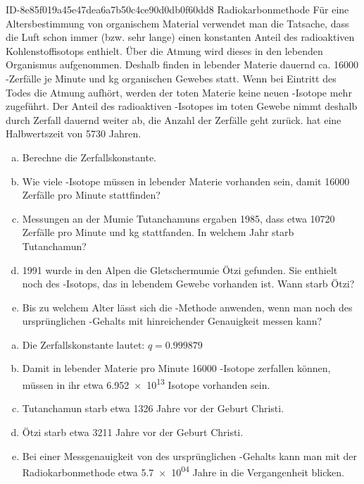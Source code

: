 \begin{exercise}
      {ID-8e85f019a45e47dea6a7b50c4ce90d0db0f60dd8}
      {Radiokarbonmethode}
  \ifproblem\problem
    Für eine Altersbestimmung von organischem Material verwendet
    man die Tatsache, dass die Luft schon immer (bzw. sehr lange)
    einen konstanten Anteil des radioaktiven Kohlenstoffisotops
     enthielt. Über die Atmung wird dieses in den
    lebenden Organismus aufgenommen. Deshalb finden in lebender
    Materie dauernd ca. \num{16000} -Zerfälle je Minute
    und \si{\kilo\gram} organischen Gewebes statt. Wenn bei
    Eintritt des Todes die Atmung aufhört, werden der toten
    Materie keine neuen -Isotope mehr zugeführt.
    Der Anteil des radioaktiven -Isotopes im toten
    Gewebe nimmt deshalb durch Zerfall dauernd weiter ab, die
    Anzahl der Zerfälle geht zurück.  hat eine
    Halbwertszeit von \num{5730} Jahren.
    \begin{enumerate}[a)]
      \item Berechne die Zerfallskonstante.
      \item Wie viele -Isotope müssen in 
            lebender Materie vorhanden sein, damit \num{16000}
            Zerfälle pro Minute stattfinden?
      \item Messungen an der Mumie Tutanchamuns ergaben
            1985, dass etwa \num{10720} Zerfälle pro Minute
            und \si{\kilo\gram} stattfanden. In welchem Jahr
            starb Tutanchamun?
      \item 1991 wurde in den Alpen die Gletschermumie
            \glqq Ötzi\grqq{} gefunden. Sie enthielt noch 
            des -Isotops, das in lebendem Gewebe
            vorhanden ist. Wann starb \glqq Ötzi\grqq?
      \item Bis zu welchem Alter lässt sich die
            -Methode anwenden, wenn man noch
             des ursprünglichen -Gehalts
            mit hinreichender Genauigkeit messen kann?
    \end{enumerate}
  \fi
  \ifoutcome\outcome
    \begin{enumerate}[a)]
      \item Die Zerfallskonstante lautet: $q=\num{0.999879}$
      \item Damit in  lebender Materie pro Minute \num{16000}
            -Isotope zerfallen können, müssen
            in ihr etwa \num{6.952e+13} Isotope vorhanden sein.
      \item Tutanchamun starb etwa \num{1326} Jahre vor der
            Geburt Christi.
      \item Ötzi starb etwa \num{3211} Jahre vor der Geburt Christi.
      \item Bei einer Messgenauigkeit von  des ursprünglichen
            -Gehalts kann man mit der Radiokarbonmethode
            etwa \num{5.7e+04} Jahre in die Vergangenheit blicken.
    \end{enumerate}
  \fi
\end{exercise}
